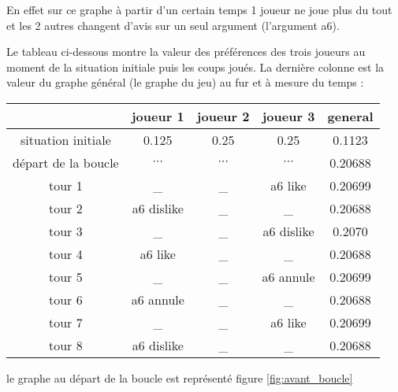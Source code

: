 \documentclass[12pt]{article}
\theoremstyle{defi}
\theoremstyle{not}
\theoremstyle{prob}
\begin{document}
      En effet sur ce graphe à partir d'un certain temps 1 joueur ne joue plus du tout et les 2 autres changent d'avis sur un seul argument (l'argument a6).

      Le tableau ci-dessous montre la valeur des préférences des trois joueurs au moment de la situation initiale puis les coups joués. La dernière colonne est la valeur du graphe général (le graphe du jeu) au fur et à mesure du temps :

      \begin{tabular}{|c|c|c|c|c|}
        \hline
                            & joueur 1   & joueur 2 & joueur 3    & general \\
        \hline
        situation initiale  & 0.125      & 0.25     & 0.25        & 0.1123 \\
        \hline
        départ de la boucle & $\cdots$   & $\cdots$ & $\cdots$    & 0.20688 \\
        \hline
        tour 1              & \_         & \_       & a6 like     & 0.20699 \\
        \hline
        tour 2              & a6 dislike & \_       & \_          & 0.20688 \\
        \hline
        tour 3              & \_         & \_       & a6 dislike  & 0.2070 \\
        \hline
        tour 4              & a6 like    & \_       & \_          & 0.20688 \\
        \hline
        tour 5              & \_         & \_       & a6 annule   & 0.20699 \\
        \hline
        tour 6              & a6 annule  & \_       & \_          & 0.20688 \\
        \hline
        tour 7              & \_         & \_       & a6 like     & 0.20699 \\
        \hline
        tour 8              & a6 dislike & \_       & \_          & 0.20688 \\
        \hline
      \end{tabular}

      le graphe au départ de la boucle est représenté figure \ref{fig:avant_boucle}
\end{document}
